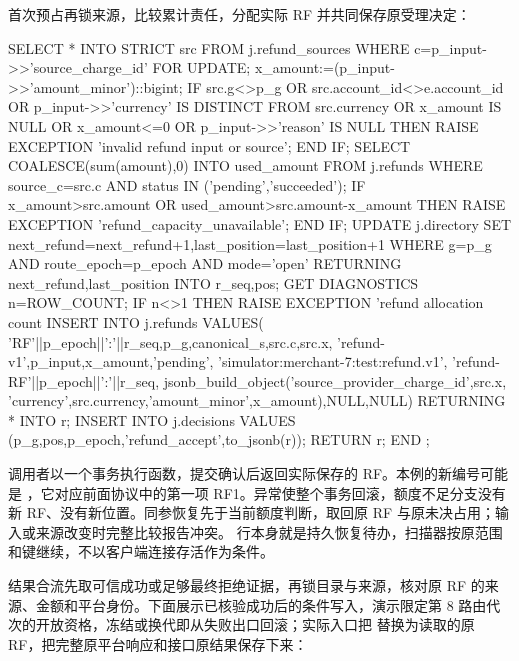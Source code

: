 首次预占再锁来源，比较累计责任，分配实际 RF 并共同保存原受理决定：

\begin{BookCode}
 SELECT * INTO STRICT src FROM j.refund_sources
  WHERE c=p_input->>'source_charge_id' FOR UPDATE;
 x_amount:=(p_input->>'amount_minor')::bigint;
 IF src.g<>p_g OR src.account_id<>e.account_id
    OR p_input->>'currency' IS DISTINCT FROM src.currency
    OR x_amount IS NULL OR x_amount<=0
    OR p_input->>'reason' IS NULL THEN
   RAISE EXCEPTION 'invalid refund input or source';
 END IF;
 SELECT COALESCE(sum(amount),0) INTO used_amount FROM j.refunds
  WHERE source_c=src.c AND status IN ('pending','succeeded');
 IF x_amount>src.amount OR used_amount>src.amount-x_amount THEN
   RAISE EXCEPTION 'refund_capacity_unavailable';
 END IF;
 UPDATE j.directory
  SET next_refund=next_refund+1,last_position=last_position+1
  WHERE g=p_g AND route_epoch=p_epoch AND mode='open'
  RETURNING next_refund,last_position INTO r_seq,pos;
 GET DIAGNOSTICS n=ROW_COUNT;
 IF n<>1 THEN RAISE EXCEPTION 'refund allocation count %
 INSERT INTO j.refunds VALUES(
  'RF'||p_epoch||':'||r_seq,p_g,canonical_s,src.c,src.x,
  'refund-v1',p_input,x_amount,'pending',
  'simulator:merchant-7:test:refund.v1',
  'refund-RF'||p_epoch||':'||r_seq,
  jsonb_build_object('source_provider_charge_id',src.x,
    'currency',src.currency,'amount_minor',x_amount),NULL,NULL)
 RETURNING * INTO r;
 INSERT INTO j.decisions VALUES
  (p_g,pos,p_epoch,'refund_accept',to_jsonb(r));
 RETURN r;
END $$;
\end{BookCode}

调用者以一个事务执行函数，提交确认后返回实际保存的 RF。本例的新编号可能是 ，它对应前面协议中的第一项 RF1。异常使整个事务回滚，额度不足分支没有新 RF、没有新位置。同参恢复先于当前额度判断，取回原 RF 与原未决占用；输入或来源改变时完整比较报告冲突。 行本身就是持久恢复待办，扫描器按原范围和键继续，不以客户端连接存活作为条件。

结果合流先取可信成功或足够最终拒绝证据，再锁目录与来源，核对原 RF 的来源、金额和平台身份。下面展示已核验成功后的条件写入，演示限定第 8 路由代次的开放资格，冻结或换代即从失败出口回滚；实际入口把  替换为读取的原 RF，把完整原平台响应和接口原结果保存下来：

